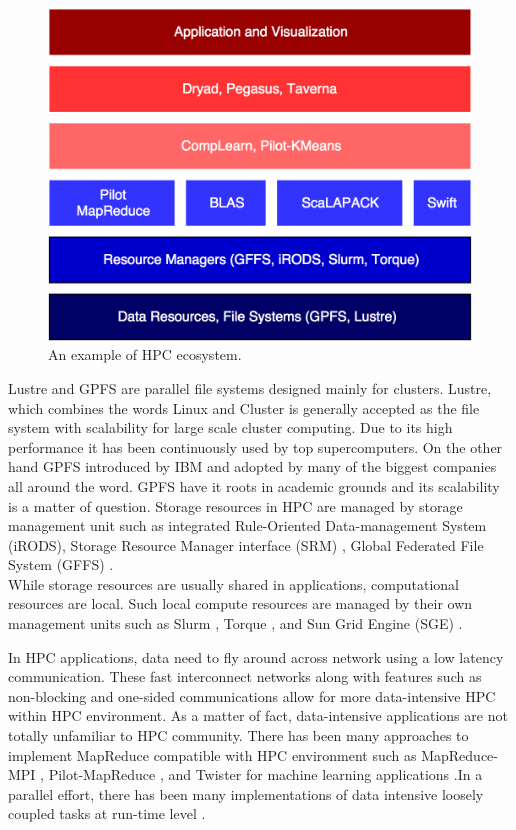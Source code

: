 \documentclass[runningheads,a4paper]{llncs}
\begin{document}
\begin{figure}
	\includegraphics[scale=0.23]{./images/hpc_ecosystem.png}
	\centering
	\caption{An example of HPC ecosystem.}
	\label{fig:HPC_ecosystem}
\end{figure}

Lustre and GPFS are parallel file systems designed mainly for clusters. Lustre, which combines the words Linux and Cluster is generally accepted as the file system with scalability for large scale cluster computing. Due to its high performance it has been continuously used by top supercomputers. On the other hand GPFS introduced by IBM and adopted by many of the biggest companies all around the word. GPFS have it roots in academic grounds and its scalability is a matter of question. Storage resources in HPC are managed by storage management unit such as integrated Rule-Oriented Data-management System (iRODS), Storage Resource Manager interface (SRM) \cite{shaun2007storage} \cite{rajasekar2010irods},  Global Federated File System (GFFS) \cite{grimshaw2013gffs}.\\

While storage resources are usually shared in applications, computational resources are local. Such local compute resources are managed by their own management units such as Slurm \cite{yoo2003slurm}, Torque \cite{staples2006torque}, and Sun Grid Engine (SGE) \cite{gentzsch2001sun}.

In HPC applications, data need to fly around across network using a low latency communication. These fast interconnect networks along with features such as non-blocking and one-sided communications allow for more data-intensive HPC within HPC environment. As a matter of fact, data-intensive applications are not totally unfamiliar to HPC community. There has been many approaches to implement MapReduce compatible with HPC environment such as MapReduce-MPI \cite{plimpton2011mapreduce}, Pilot-MapReduce \cite{mantha2012pilot}, and Twister for machine learning applications \cite{ekanayake2010twister}.In a parallel effort, there has been many implementations of data intensive loosely coupled tasks at run-time level \cite{luckow2012p}\cite{raicu2008many}\cite{deelman2009workflows}.
 
\end{document}
